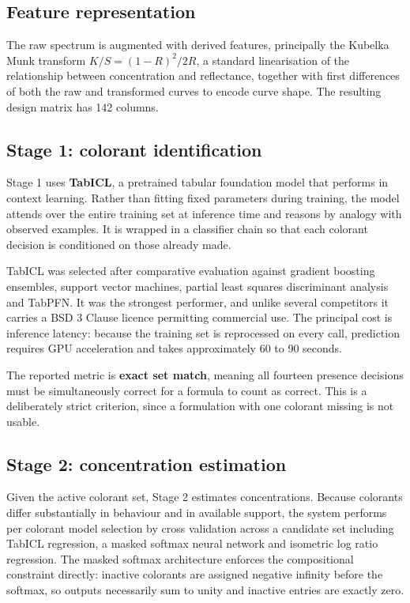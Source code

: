 \documentclass[11pt,a4paper]{article}
\begin{document}
\subsection{Feature representation}

The raw spectrum is augmented with derived features, principally the
Kubelka Munk transform $K/S = (1-R)^2 / 2R$, a standard linearisation of the
relationship between concentration and reflectance, together with first
differences of both the raw and transformed curves to encode curve shape. The
resulting design matrix has 142 columns.

\subsection{Stage 1: colorant identification}

Stage 1 uses \textbf{TabICL}, a pretrained tabular foundation model that performs
in context learning. Rather than fitting fixed parameters during training, the
model attends over the entire training set at inference time and reasons by
analogy with observed examples. It is wrapped in a classifier chain so that each
colorant decision is conditioned on those already made.

TabICL was selected after comparative evaluation against gradient boosting
ensembles, support vector machines, partial least squares discriminant analysis
and TabPFN. It was the strongest performer, and unlike several competitors it
carries a BSD 3 Clause licence permitting commercial use. The principal cost is
inference latency: because the training set is reprocessed on every call,
prediction requires GPU acceleration and takes approximately 60 to 90 seconds.

The reported metric is \textbf{exact set match}, meaning all fourteen presence
decisions must be simultaneously correct for a formula to count as correct. This
is a deliberately strict criterion, since a formulation with one colorant missing
is not usable.

\subsection{Stage 2: concentration estimation}

Given the active colorant set, Stage 2 estimates concentrations. Because colorants
differ substantially in behaviour and in available support, the system performs
per colorant model selection by cross validation across a candidate set including
TabICL regression, a masked softmax neural network and isometric log ratio
regression. The masked softmax architecture enforces the compositional constraint
directly: inactive colorants are assigned negative infinity before the softmax, so
outputs necessarily sum to unity and inactive entries are exactly zero.
\end{document}

